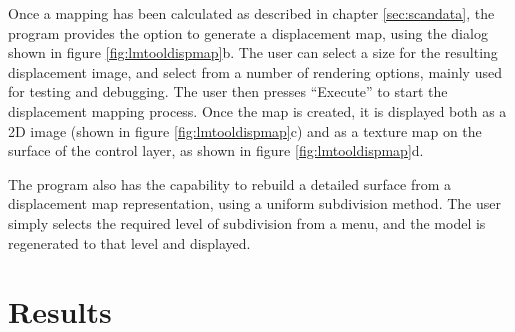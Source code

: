 Once a mapping has been calculated as described in chapter \ref{sec:scandata}, the program provides the option to generate a displacement map, using the dialog shown in figure \ref{fig:lmtooldispmap}b. The user can select a size for the resulting displacement image, and select from a number of rendering options, mainly used for testing and debugging. The user then presses ``Execute'' to start the displacement mapping process. Once the map is created, it is displayed both as a 2D image (shown in figure \ref{fig:lmtooldispmap}c) and as a texture map on the surface of the control layer, as shown in figure \ref{fig:lmtooldispmap}d.

The program also has the capability to rebuild a detailed surface from a displacement map representation, using a uniform subdivision method. The user simply selects the required level of subdivision from a menu, and the model is regenerated to that level and displayed.

\section{\label{sec:dispmapcreation:results}Results}

